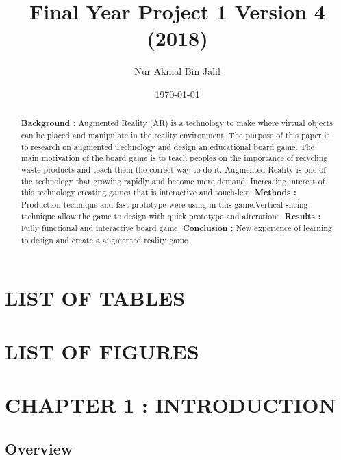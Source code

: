 \documentclass[12pt]{article}
\title{Final Year Project 1 Version 4 (2018)}
\author{Nur Akmal Bin Jalil }
\date{\today}
\begin{document}
\maketitle
\pagebreak

\begin{abstract}

\noindent\textbf{Background : }Augmented Reality (AR) is a technology to make where virtual objects can be placed and manipulate in the reality environment. The purpose of this paper is to research on augmented Technology and design an educational board game. The main motivation of the board game is to teach peoples on the importance of recycling waste products and teach them the correct way to do it. Augmented Reality is one of the technology that growing rapidly and become more demand. Increasing interest of this technology creating games that is interactive and touch-less.  
\newline \textbf{Methods : }Production technique and fast prototype were using in this game.Vertical slicing technique allow the game to design with quick prototype and alterations.
\newline \textbf{Results : }Fully functional and interactive board game. 
\newline \textbf{Conclusion : }New experience of learning to design and create a augmented reality game.
\end{abstract}

\pagebreak

\tableofcontents

\pagebreak

\section*{LIST OF TABLES}

\pagebreak

\section*{LIST OF FIGURES}

\pagebreak

\section{CHAPTER 1 : INTRODUCTION}

\subsection{Overview}
\end{document}
